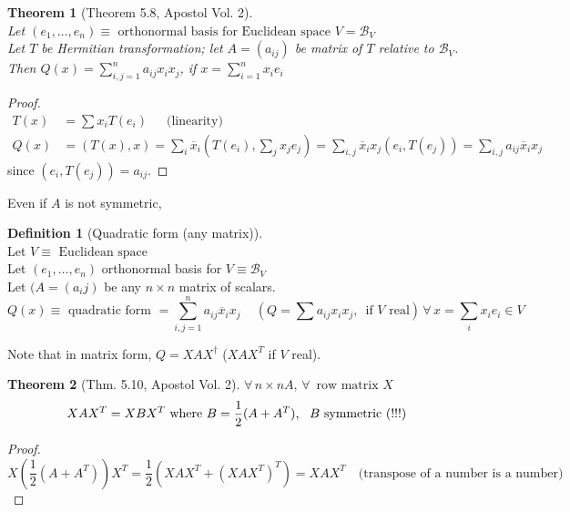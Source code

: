 \documentclass[twoside]{amsart}
\theoremstyle{plain}
\newtheorem{theorem}{Theorem}
\theoremstyle{definition}
\newtheorem{definition}{Definition}
\begin{document}
\begin{theorem}[Theorem 5.8, Apostol Vol. 2] \quad \\
Let $(e_1, \dots, e_n) \equiv \text{ orthonormal basis for Euclidean space $V=\mathcal{B}_V$ } $ \\ 
Let $T$ be Hermitian transformation; let $A = (a_{ij})$ be matrix of $T$ relative to $\mathcal{B}_V$.  \\
\quad \quad Then $Q(x) = \sum_{i,j=1}^n a_{ij} x_i x_j$, if $x = \sum_{i=1}^n x_i e_i$  
\end{theorem}

\begin{proof} 
\[
\begin{aligned}
  T(x) & = \sum x_i T(e_i)  \quad \, \text{ (linearity)} \\ 
  Q(x) & = (T(x),x)  = \sum_i \overline{x}_i (T(e_i), \sum_j x_j e_j) = \sum_{i,j} \overline{x}_i x_j (e_i,T(e_j)) = \sum_{i,j} a_{ij} \overline{x}_i x_j
\end{aligned}
\] since $(e_i,T(e_j)) = a_{ij}$.  
\end{proof}

Even if $A$ is not symmetric, 
\begin{definition}[Quadratic form (any matrix)] \quad \\
  Let $V \equiv \text{ Euclidean space }$ \\
  Let $(e_1, \dots, e_n)$ orthonormal basis for $V \equiv \mathcal{B}_V$ \\ 
  Let $(A = (a_ij)$ be any $n\times n$ matrix of scalars.  
\[
Q(x) \equiv \text{ quadratic form } = \sum_{i,j=1}^n a_{ij} \overline{x}_i x_j \quad \, (Q = \sum a_{ij} x_i x_j, \, \text{ if $V$ real}) \, \forall \, x = \sum_i x_i e_i \in V
\]
\end{definition}
Note that in matrix form, $Q = XAX^{\dag}$ ($XAX^T$ if $V$ real).  

\begin{theorem}[Thm. 5.10, Apostol Vol. 2] $\forall \, n \times n A, \, \forall \, \text{ row matrix $X$ }$  
\[
XAX^T = XBX^T \text{ where $B=\frac{1}{2} (A+A^T)$, \, $B$ symmetric (!!!)}
\]
\end{theorem}
\begin{proof}
\[
X (\frac{1}{2} (A+A^T) ) X^T = \frac{1}{2} (XAX^T + (XAX^T)^T) = XAX^T \quad \text{(transpose of a number is a number) }
\]
\end{proof}
\end{document}

